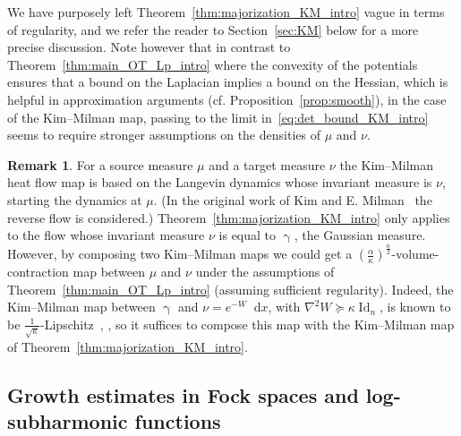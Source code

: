 \documentclass[10pt]{amsart}
\theoremstyle{definition}\newtheorem{defi}[theo]{Definition}\newtheorem{rema}[theo]{Remark}\newtheorem{exam}[theo]{Example}\newtheorem{exem}[theo]{Example}\newtheorem{nota}[theo]{Notation}
\DeclareMathOperator{\Id}{Id}
\newcommand{\W}{W}
\newcommand{\dd}{n}
\newcommand{\source}{\mu}
\newcommand{\target}{\nu}
\newcommand{\lsh}{\alpha}
\newcommand{\lc}{\kappa}
\newcommand*\diff{\mathop{}\!\mathrm{d}}
\newcommand{\Gaussian}{\upgamma}
\begin{document}
We have purposely left Theorem~\ref{thm:majorization_KM_intro} vague in terms of regularity, and we refer the reader to Section~\ref{sec:KM} below for a more precise discussion. Note however that in contrast to Theorem~\ref{thm:main_OT_Lp_intro} where the convexity of the potentials ensures that a bound on the Laplacian implies a bound on the Hessian, which is helpful in approximation arguments (cf. Proposition~\ref{prop:smooth}), in the case of the Kim--Milman map, passing to the limit in~\eqref{eq:det_bound_KM_intro} seems to require stronger assumptions on the densities of $\source$ and $\target$.



\begin{rema}\label{rem:compose}
For a source measure $\source$ and a target measure $\target$ the Kim--Milman heat flow map is based on the Langevin dynamics whose invariant measure is $\target$, starting the dynamics at $\source$. (In the original work of Kim and E. Milman~\cite{MR2983070} the reverse flow is considered.) Theorem~\ref{thm:majorization_KM_intro} only applies to the flow whose invariant measure $\target$ is equal to $\Gaussian$, the Gaussian measure. However, by composing two Kim--Milman maps we could get a $(\frac{\lsh}{\lc})^{\frac{\dd}{2}}$-volume-contraction map between $\source$ and $\target$ under the assumptions of Theorem~\ref{thm:main_OT_Lp_intro} (assuming sufficient regularity). Indeed, the Kim--Milman map between $\Gaussian$ and $\target=e^{-W}\diff x$, with $\nabla^2\W \succeq \lc \Id_{\dd}$, is known to be $\frac{1}{\sqrt{\lc}}$-Lipschitz~\cite[Theorem~1.1]{MR2983070}, \cite[Theorem~1]{MS2022}, so it suffices to compose this map with the Kim--Milman map of Theorem~\ref{thm:majorization_KM_intro}.
\end{rema}



\subsection{Growth estimates in Fock spaces and log-subharmonic functions}
\end{document}
